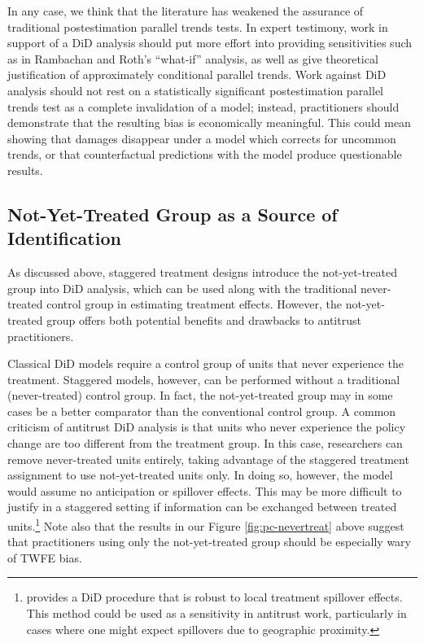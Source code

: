 \documentclass[12pt]{article}
\begin{document}
In any case, we think that the literature has weakened the assurance of traditional postestimation parallel trends tests. In expert testimony, work in support of a DiD analysis should put more effort into providing sensitivities such as in Rambachan and Roth’s “what-if” analysis, as well as give theoretical justification of approximately conditional parallel trends. Work against DiD analysis should not rest on a statistically significant postestimation parallel trends test as a complete invalidation of a model; instead, practitioners should demonstrate that the resulting bias is economically meaningful. This could mean showing that damages disappear under a model which corrects for uncommon trends, or that counterfactual predictions with the model produce questionable results.

\subsection{Not-Yet-Treated Group as a Source of Identification} \label{sec:notyettreated}
As discussed above, staggered treatment designs introduce the not-yet-treated group into DiD analysis, which can be used along with the traditional never-treated control group in estimating treatment effects. However, the not-yet-treated group offers both potential benefits and drawbacks to antitrust practitioners.

Classical DiD models require a control group of units that never experience the treatment. Staggered models, however, can be performed without a traditional (never-treated) control group. In fact, the not-yet-treated group may in some cases be a better comparator than the conventional control group. A common criticism of antitrust DiD analysis is that units who never experience the policy change are too different from the treatment group. In this case, researchers can remove never-treated units entirely, taking advantage of the staggered treatment assignment to use not-yet-treated units only. In doing so, however, the model would assume no anticipation or spillover effects. This may be more difficult to justify in a staggered setting if information can be exchanged between treated units.\footnote{\citet{clarke2017estimating} provides a DiD procedure that is robust to local treatment spillover effects. This method could be used as a sensitivity in antitrust work, particularly in cases where one might expect spillovers due to geographic proximity.} Note also that the results in our Figure \ref{fig:pc-nevertreat} above suggest that practitioners using only the not-yet-treated group should be especially wary of TWFE bias.
\end{document}
